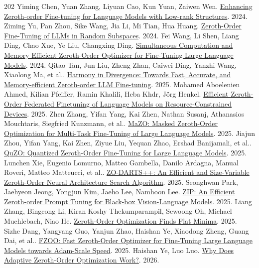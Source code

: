 \begin{thebibliography}{202}
 Yiming Chen, Yuan Zhang, Liyuan Cao, Kun Yuan, Zaiwen Wen. \href{https://arxiv.org/abs/2410.07698v1}{Enhancing Zeroth-order Fine-tuning for Language Models with Low-rank Structures}. 2024.
 Ziming Yu, Pan Zhou, Sike Wang, Jia Li, Mi Tian, Hua Huang. \href{https://arxiv.org/abs/2410.08989}{Zeroth-Order Fine-Tuning of LLMs in Random Subspaces}. 2024.
 Fei Wang, Li Shen, Liang Ding, Chao Xue, Ye Liu, Changxing Ding. \href{https://arxiv.org/abs/2410.09823v1}{Simultaneous Computation and Memory Efficient Zeroth-Order Optimizer for Fine-Tuning Large Language Models}. 2024.
 Qitao Tan, Jun Liu, Zheng Zhan, Caiwei Ding, Yanzhi Wang, Xiaolong Ma, et al.. \href{https://arxiv.org/abs/2502.03304v4}{Harmony in Divergence: Towards Fast, Accurate, and Memory-efficient Zeroth-order LLM Fine-tuning}. 2025.
 Mohamed Aboelenien Ahmed, Kilian Pfeiffer, Ramin Khalili, Heba Khdr, Jörg Henkel. \href{https://arxiv.org/abs/2502.10239v3}{Efficient Zeroth-Order Federated Finetuning of Language Models on Resource-Constrained Devices}. 2025.
 Zhen Zhang, Yifan Yang, Kai Zhen, Nathan Susanj, Athanasios Mouchtaris, Siegfried Kunzmann, et al.. \href{https://arxiv.org/abs/2502.11513v1}{MaZO: Masked Zeroth-Order Optimization for Multi-Task Fine-Tuning of Large Language Models}. 2025.
 Jiajun Zhou, Yifan Yang, Kai Zhen, Ziyue Liu, Yequan Zhao, Ershad Banijamali, et al.. \href{https://arxiv.org/abs/2502.12346v1}{QuZO: Quantized Zeroth-Order Fine-Tuning for Large Language Models}. 2025.
 Lunchen Xie, Eugenio Lomurno, Matteo Gambella, Danilo Ardagna, Manual Roveri, Matteo Matteucci, et al.. \href{https://arxiv.org/abs/2503.06092v1}{ZO-DARTS++: An Efficient and Size-Variable Zeroth-Order Neural Architecture Search Algorithm}. 2025.
 Seonghwan Park, Jaehyeon Jeong, Yongjun Kim, Jaeho Lee, Namhoon Lee. \href{https://arxiv.org/abs/2504.06838v1}{ZIP: An Efficient Zeroth-order Prompt Tuning for Black-box Vision-Language Models}. 2025.
 Liang Zhang, Bingcong Li, Kiran Koshy Thekumparampil, Sewoong Oh, Michael Muehlebach, Niao He. \href{https://arxiv.org/abs/2506.05454v2}{Zeroth-Order Optimization Finds Flat Minima}. 2025.
 Sizhe Dang, Yangyang Guo, Yanjun Zhao, Haishan Ye, Xiaodong Zheng, Guang Dai, et al.. \href{https://arxiv.org/abs/2506.09034v2}{FZOO: Fast Zeroth-Order Optimizer for Fine-Tuning Large Language Models towards Adam-Scale Speed}. 2025.
 Haishan Ye, Luo Luo. \href{https://arxiv.org/abs/2602.01627v1}{Why Does Adaptive Zeroth-Order Optimization Work?}. 2026.

\end{thebibliography}
